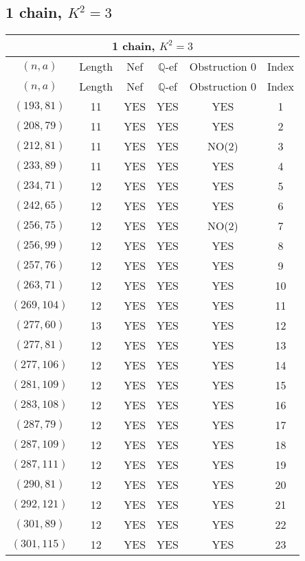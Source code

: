 \subsection{1 chain, $K^2 = 3$}
\begin{longtable}{|c|c|c|c|c|c|}
\hline
\multicolumn{6}{|c|}{1 chain, $K^2 = 3$}\\
\hline
$(n,a)$ & Length & Nef & $\mathbb Q$-ef & Obstruction 0 & Index\\
\hline
\endfirsthead

\hline
$(n,a)$ & Length & Nef & $\mathbb Q$-ef & Obstruction 0 & Index\\
\hline
\endhead
\hline
\endfoot

$(193, 81)$ & 11 & YES & YES & YES & 1\\
$(208, 79)$ & 11 & YES & YES & YES & 2\\
$(212, 81)$ & 11 & YES & YES & NO(2) & 3\\
$(233, 89)$ & 11 & YES & YES & YES & 4\\
$(234, 71)$ & 12 & YES & YES & YES & 5\\
$(242, 65)$ & 12 & YES & YES & YES & 6\\
$(256, 75)$ & 12 & YES & YES & NO(2) & 7\\
$(256, 99)$ & 12 & YES & YES & YES & 8\\
$(257, 76)$ & 12 & YES & YES & YES & 9\\
$(263, 71)$ & 12 & YES & YES & YES & 10\\
$(269, 104)$ & 12 & YES & YES & YES & 11\\
$(277, 60)$ & 13 & YES & YES & YES & 12\\
$(277, 81)$ & 12 & YES & YES & YES & 13\\
$(277, 106)$ & 12 & YES & YES & YES & 14\\
$(281, 109)$ & 12 & YES & YES & YES & 15\\
$(283, 108)$ & 12 & YES & YES & YES & 16\\
$(287, 79)$ & 12 & YES & YES & YES & 17\\
$(287, 109)$ & 12 & YES & YES & YES & 18\\
$(287, 111)$ & 12 & YES & YES & YES & 19\\
$(290, 81)$ & 12 & YES & YES & YES & 20\\
$(292, 121)$ & 12 & YES & YES & YES & 21\\
$(301, 89)$ & 12 & YES & YES & YES & 22\\
$(301, 115)$ & 12 & YES & YES & YES & 23\\

\end{longtable}
